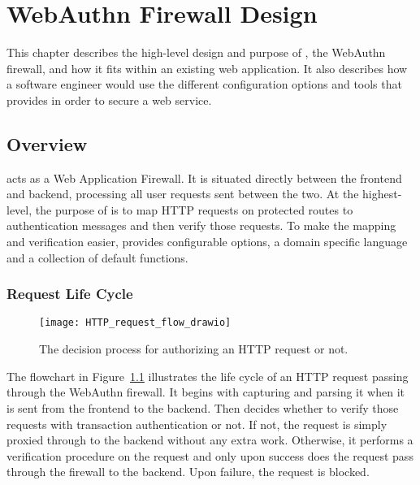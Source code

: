 \chapter{WebAuthn Firewall Design}\label{Chap:WebauthnFirewallDesign}

This chapter describes the high-level design and purpose of \sys{}, the WebAuthn firewall, and how it fits within an existing web application. It also describes how a software engineer would use the different configuration options and tools that \sys{} provides in order to secure a web service.

\section{Overview}

\sys{} acts as a Web Application Firewall. It is situated directly between the frontend and backend, processing all user requests sent between the two. At the highest-level, the purpose of \sys{} is to map HTTP requests on protected routes to authentication messages and then verify those requests. To make the mapping and verification easier, \sys{} provides configurable options, a domain specific language and a collection of default functions.

\subsection{Request Life Cycle}

\begin{figure}[h]
  \centering
  \texttt{[image: HTTP\_request\_flow\_drawio]}
  \caption{The decision process for authorizing an HTTP request or not.}  
  \label{fig:RequestLifeCycle}
\end{figure}

The flowchart in Figure~\ref{fig:RequestLifeCycle} illustrates the life cycle of an HTTP request passing through the WebAuthn firewall. It begins with \sys{} capturing and parsing it when it is sent from the frontend to the backend. Then \sys{} decides whether to verify those requests with transaction authentication or not. If not, the request is simply proxied through to the backend without any extra work. Otherwise, it performs a verification procedure on the request and only upon success does the request pass through the firewall to the backend. Upon failure, the request is blocked.

